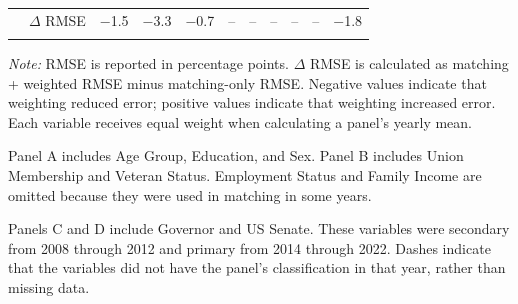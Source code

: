 \begin{table}[!htbp]
{\begin{threeparttable}
\begin{tabular}{lccccccccc}
~~$\Delta$ RMSE & $-$1.5 & $-$3.3 & $-$0.7 & -- & -- & -- & -- & -- & $-$1.8 \\
\addlinespace[0.2em]
\bottomrule
\end{tabular}%
\begin{tablenotes}
\footnotesize
\item \textit{Note:} RMSE is reported in percentage points. $\Delta$ RMSE is calculated as matching + weighted RMSE minus matching-only RMSE. Negative values indicate that weighting reduced error; positive values indicate that weighting increased error. Each variable receives equal weight when calculating a panel's yearly mean.
\item Panel A includes Age Group, Education, and Sex. Panel B includes Union Membership and Veteran Status. Employment Status and Family Income are omitted because they were used in matching in some years.
\item Panels C and D include Governor and US Senate. These variables were secondary from 2008 through 2012 and primary from 2014 through 2022. Dashes indicate that the variables did not have the panel's classification in that year, rather than missing data.
\end{tablenotes}
\end{threeparttable}%
}
\end{table}